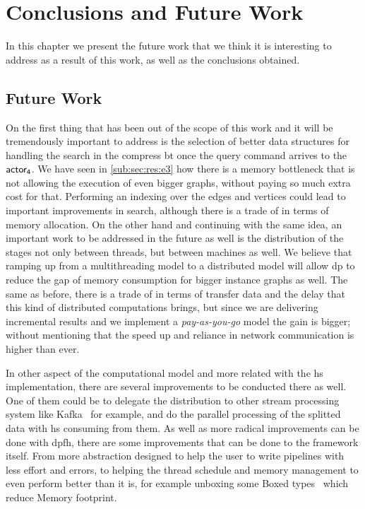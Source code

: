 \chapter{Conclusions and Future Work}\label{conclusions}
In this chapter we present the future work that we think it is interesting to address as a result of this work, 
as well as the conclusions obtained.

\section{Future Work}
On the first thing that has been out of the scope of this work and it will be tremendously important to address is 
the selection of better data structures for handling the search in the compress \acrshort{bt} once the query command arrives to the $\mathsf{actor_4}$.
We have seen in \autoref{sub:sec:res:e3} how there is a memory bottleneck that is not allowing the execution of even bigger graphs, without 
paying so much extra cost for that. Performing an indexing over the edges and vertices could lead to important improvements in search, although there
is a trade of in terms of memory allocation.
On the other hand and continuing with the same idea, an important work to be addressed in the future as well is the distribution of the stages not only between threads,
but between machines as well. We believe that ramping up from a multithreading model to a distributed model will allow \acrlong{dp} to reduce the gap of memory consumption
for bigger instance graphs as well. The same as before, there is a trade of in terms of transfer data and the delay that this kind of distributed computations brings, but 
since we are delivering incremental results and we implement a \emph{pay-as-you-go} model the gain is bigger; without mentioning that the speed up and reliance in network communication
is higher than ever.

In other aspect of the computational model and more related with the \acrlong{hs} implementation, there are several improvements to be conducted there as well. One of them could be
to delegate the distribution to other stream processing system like Kafka~\cite{kafka} for example, and do the parallel processing of the splitted data with \acrshort{hs} consuming from them.
As well as more radical improvements can be done with \acrshort{dpfh}, there are some improvements that can be done to the framework itself. From more abstraction designed to help the user to write
pipelines with less effort and errors, to helping the thread schedule and memory management to even perform better than it is, for example unboxing some Boxed types~\cite{hs-unbox} which reduce Memory
footprint.

